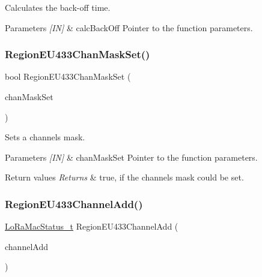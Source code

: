 Calculates the back-\/off time. 


\begin{DoxyParams}{Parameters}
{\em \mbox{[}\+I\+N\mbox{]}} & calc\+Back\+Off Pointer to the function parameters. \\
\hline
\end{DoxyParams}
\mbox{\label{group__REGIONEU433_ga9f5e0e0881857bae99067d739c037882}} 
\subsubsection{\texorpdfstring{Region\+E\+U433\+Chan\+Mask\+Set()}{RegionEU433ChanMaskSet()}}
{\footnotesize\ttfamily bool Region\+E\+U433\+Chan\+Mask\+Set (\begin{DoxyParamCaption}\item[{\hyperlink{group__REGION_ga6d24f7da136006410827dfb29f6b9b9e}{Chan\+Mask\+Set\+Params\+\_\+t} $\ast$}]{chan\+Mask\+Set }\end{DoxyParamCaption})}



Sets a channels mask. 


\begin{DoxyParams}{Parameters}
{\em \mbox{[}\+I\+N\mbox{]}} & chan\+Mask\+Set Pointer to the function parameters.\\
\hline
\end{DoxyParams}

\begin{DoxyRetVals}{Return values}
{\em Returns} & true, if the channels mask could be set. \\
\hline
\end{DoxyRetVals}
\mbox{\label{group__REGIONEU433_ga477a869bd33f0fc4a1104e1a2097418a}} 
\subsubsection{\texorpdfstring{Region\+E\+U433\+Channel\+Add()}{RegionEU433ChannelAdd()}}
{\footnotesize\ttfamily \hyperlink{group__LORAMAC_ga30bd25657e10480f8605ee951b0ecfbd}{Lo\+Ra\+Mac\+Status\+\_\+t} Region\+E\+U433\+Channel\+Add (\begin{DoxyParamCaption}\item[{\hyperlink{group__REGION_gab1c5f3aa06614283202906cef4417860}{Channel\+Add\+Params\+\_\+t} $\ast$}]{channel\+Add }\end{DoxyParamCaption})}



